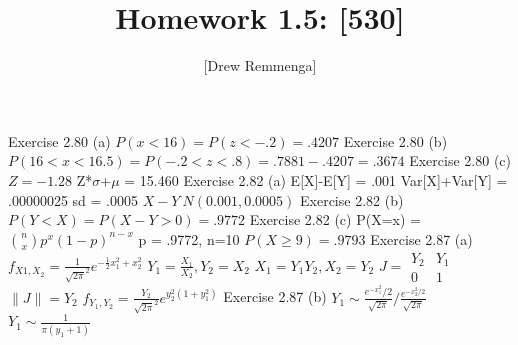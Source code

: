 \documentclass[10pt, oneside]{article}
\title{Homework 1.5: [530]}
\author{[Drew Remmenga]}
\begin{document}
\maketitle
\pagebreak
Exercise 2.80 (a)
$P(x<16)=P(z<-.2)=.4207$
\clearpage
Exercise 2.80 (b)
$P(16<x<16.5)=P(-.2<z<.8) = .7881-.4207=.3674$
\clearpage
Exercise 2.80 (c)
$Z=-1.28$
Z*$\sigma$+$\mu$ = 15.460
\clearpage
Exercise 2.82 (a)
E[X]-E[Y] = .001
Var[X]+Var[Y] = .00000025
sd = .0005
$X-Y ~ N(0.001,0.0005)$
\clearpage
Exercise 2.82 (b)
$P(Y<X) = P(X-Y>0) =.9772$
\clearpage
Exercise 2.82 (c)
P(X=x) = ${n \choose x} p^{x} (1-p)^{n-x}$ p = .9772, n=10
$P(X\geq 9) = .9793$
\clearpage
Exercise 2.87 (a)
$f_{X{1},X_{2}} = \frac{1}{\sqrt{2\pi}^{2}}e^{-\frac{1}{2}x_{1}^{2}+x_{2}^{2}}$
$Y_{1}=\frac{X_{1}}{X_{2}}, Y_{2} = X_{2}$
$X_{1}=Y_{1}Y_{2}, X_{2} = Y_{2}$
$J = \begin{matrix} Y_{2} & Y_{1} \\
    0 & 1\end{matrix}$
$\|J \| =   Y_{2}$
$f_{Y_{1},Y_{2}}=\frac{Y_{2}}{\sqrt{2\pi}^{2}}e^{y_{2}^{2}(1+y_{1}^{2})}$
\clearpage
Exercise 2.87 (b)
$Y_{1} \sim \frac{e^{-x_{1}^{2}}/2}{\sqrt{2\pi}}/\frac{e^{-x_{2}^{2}/2}}{\sqrt{2\pi}}$
$Y_{1} \sim \frac{1}{\pi(y_{1}+1)}$
\end{document}
